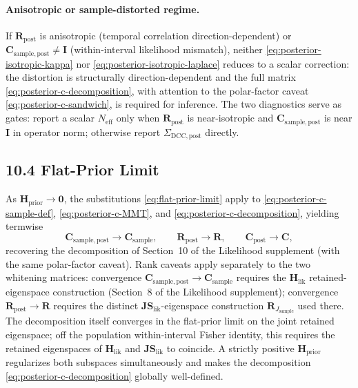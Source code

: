 \documentclass[11pt]{article}
\begin{document}
\paragraph{Anisotropic or sample-distorted regime.}
If $\mathbf R_{\mathrm{post}}$ is anisotropic (temporal correlation direction-dependent) or $\mathbf C_{\mathrm{sample},\mathrm{post}} \neq \mathbf I$ (within-interval likelihood mismatch), neither \eqref{eq:posterior-isotropic-kappa} nor \eqref{eq:posterior-isotropic-laplace} reduces to a scalar correction: the distortion is structurally direction-dependent and the full matrix \eqref{eq:posterior-c-decomposition}, with attention to the polar-factor caveat \eqref{eq:posterior-c-sandwich}, is required for inference. The two diagnostics serve as gates: report a scalar $N_{\mathrm{eff}}$ only when $\mathbf R_{\mathrm{post}}$ is near-isotropic and $\mathbf C_{\mathrm{sample},\mathrm{post}}$ is near $\mathbf I$ in operator norm; otherwise report $\Sigma_{\mathrm{DCC},\mathrm{post}}$ directly.

\subsection*{10.4 Flat-Prior Limit}

As $\mathbf H_{\mathrm{prior}} \to \mathbf 0$, the substitutions \eqref{eq:flat-prior-limit} apply to \eqref{eq:posterior-c-sample-def}, \eqref{eq:posterior-c-MMT}, and \eqref{eq:posterior-c-decomposition}, yielding termwise
\begin{equation}
\mathbf C_{\mathrm{sample},\mathrm{post}} \to \mathbf C_{\mathrm{sample}},
\qquad
\mathbf R_{\mathrm{post}} \to \mathbf R,
\qquad
\mathbf C_{\mathrm{post}} \to \mathbf C,
\label{eq:posterior-decomp-flat}
\end{equation}
recovering the decomposition of Section~10 of the Likelihood supplement (with the same polar-factor caveat). Rank caveats apply separately to the two whitening matrices: convergence $\mathbf C_{\mathrm{sample},\mathrm{post}} \to \mathbf C_{\mathrm{sample}}$ requires the $\mathbf H_{\mathrm{lik}}$ retained-eigenspace construction (Section~8 of the Likelihood supplement); convergence $\mathbf R_{\mathrm{post}} \to \mathbf R$ requires the distinct $\mathbf{JS}_{\mathrm{lik}}$-eigenspace construction $\mathbf R_{J_{\mathrm{sample}}}$ used there. The decomposition itself converges in the flat-prior limit on the joint retained eigenspace; off the population within-interval Fisher identity, this requires the retained eigenspaces of $\mathbf H_{\mathrm{lik}}$ and $\mathbf{JS}_{\mathrm{lik}}$ to coincide. A strictly positive $\mathbf H_{\mathrm{prior}}$ regularizes both subspaces simultaneously and makes the decomposition \eqref{eq:posterior-c-decomposition} globally well-defined.
\end{document}
